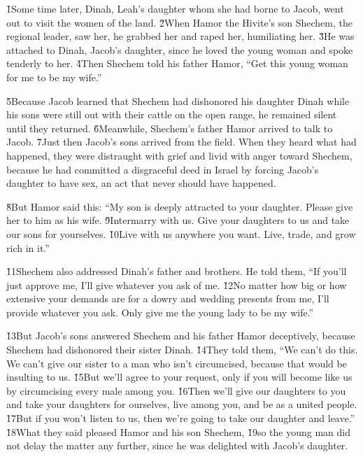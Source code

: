 \v{1}Some time later, Dinah, Leah's daughter whom she had borne to Jacob, went out to visit the women of the land. \v{2}When Hamor the Hivite's son Shechem, the regional leader, saw her, he grabbed her and raped her, humiliating her. \v{3}He was attached to Dinah, Jacob's daughter, since he loved the young woman and spoke tenderly to her. \v{4}Then Shechem told his father Hamor, ``Get this young woman for me to be my wife.''

\v{5}Because Jacob learned that Shechem had dishonored his daughter Dinah while his sons were still out with their cattle on the open range, he remained silent until they returned. \v{6}Meanwhile, Shechem's father Hamor arrived to talk to Jacob. \v{7}Just then Jacob's sons arrived from the field. When they heard what had happened, they were distraught with grief and livid with anger toward Shechem, because he had committed a disgraceful deed in Israel by forcing Jacob's daughter to have sex, an act that never should have happened.

\v{8}But Hamor said this: ``My son is deeply attracted to your daughter. Please give her to him as his wife. \v{9}Intermarry with us. Give your daughters to us and take our sons for yourselves. \v{10}Live with us anywhere you want. Live, trade, and grow rich in it.''

\v{11}Shechem also addressed Dinah's father and brothers. He told them, ``If you'll just approve me, I'll give whatever you ask of me. \v{12}No matter how big or how extensive your demands are for a dowry and wedding presents from me, I'll provide whatever you ask. Only give me the young lady to be my wife.''

\v{13}But Jacob's sons answered Shechem and his father Hamor deceptively, because Shechem had dishonored their sister Dinah. \v{14}They told them, ``We can't do this. We can't give our sister to a man who isn't circumcised, because that would be insulting to us. \v{15}But we'll agree to your request, only if you will become like us by circumcising every male among you. \v{16}Then we'll give our daughters to you and take your daughters for ourselves, live among you, and be as a united people. \v{17}But if you won't listen to us, then we're going to take our daughter and leave.'' \v{18}What they said pleased Hamor and his son Shechem, \v{19}so the young man did not delay the matter any further, since he was delighted with Jacob's daughter.


